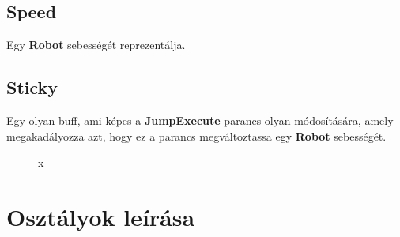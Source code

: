 \subsection{Speed}
Egy \textbf{Robot} sebességét reprezentálja.

\subsection{Sticky}
Egy olyan buff, ami képes a \textbf{JumpExecute} parancs olyan módosítására, amely megakadályozza azt, hogy ez a parancs megváltoztassa egy \textbf{Robot} sebességét.


\begin{figure}[h]
\begin{center}
\caption{x}
\label{fig:example1}
\end{center}
\end{figure}


\section{Osztályok leírása}

